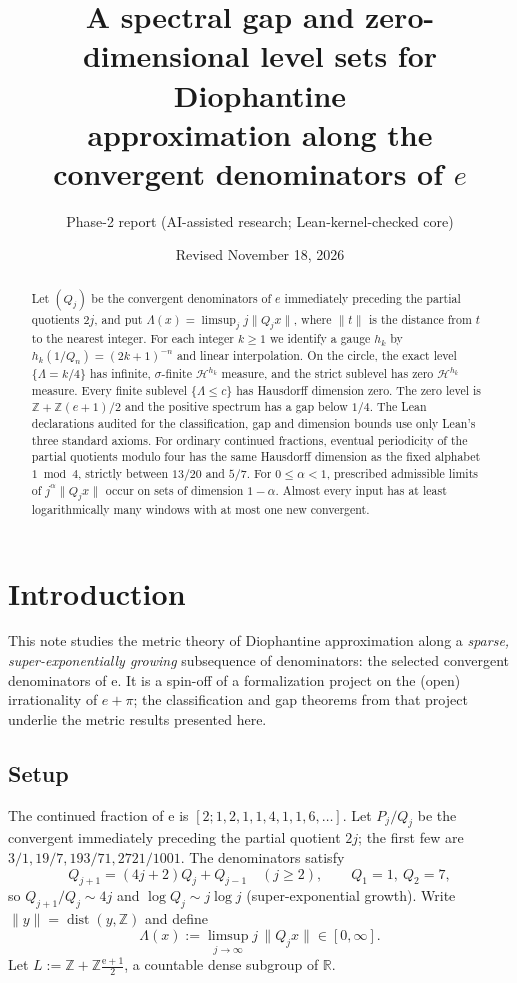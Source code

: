 \documentclass[11pt]{article}
\title{A spectral gap and zero-dimensional level sets for Diophantine\\
approximation along the convergent denominators of \texorpdfstring{$e$}{e}}
\author{Phase-2 report (AI-assisted research; Lean-kernel-checked core)}
\date{Revised November 18, 2026}
\theoremstyle{definition}
\theoremstyle{remark}
\newcommand{\R}{\mathbb{R}}
\newcommand{\Z}{\mathbb{Z}}
\newcommand{\ee}{\mathrm{e}}
\newcommand{\dist}{\operatorname{dist}}
\newcommand{\Lam}{\Lambda}
\begin{document}
\maketitle

\begin{abstract}
Let $(Q_j)$ be the convergent denominators of $e$ immediately preceding
the partial quotients $2j$, and put $\Lambda(x)=\limsup_j j\|Q_jx\|$,
where $\|t\|$ is the distance from $t$ to the nearest integer.
For each integer $k\ge1$ we identify a gauge $h_k$ by
$h_k(1/Q_n)=(2k+1)^{-n}$ and linear interpolation. On the circle,
the exact level $\{\Lambda=k/4\}$ has infinite, $\sigma$-finite
$\mathcal H^{h_k}$ measure, and the strict sublevel has zero
$\mathcal H^{h_k}$ measure. Every finite sublevel
$\{\Lambda\le c\}$ has Hausdorff dimension zero. The zero level is
$\mathbb Z+\mathbb Z(e+1)/2$ and the positive spectrum has a gap
below $1/4$. The Lean declarations audited for the classification,
gap and dimension bounds use only Lean's three standard axioms.
For ordinary continued fractions, eventual periodicity of the
partial quotients modulo four has the same Hausdorff dimension
as the fixed alphabet $1\bmod 4$, strictly between $13/20$ and $5/7$.
For $0\le\alpha<1$, prescribed admissible limits of
$j^\alpha\|Q_jx\|$ occur on sets of dimension $1-\alpha$.
Almost every input has at least logarithmically many windows with
at most one new convergent.
\end{abstract}

\section{Introduction}

This note studies the metric theory of Diophantine approximation along a
\emph{sparse, super-exponentially growing} subsequence of denominators: the
selected convergent denominators of $\ee$. It is a spin-off of a formalization
project on the (open) irrationality of $e+\pi$; the classification and gap
theorems from that project underlie the metric results presented here.

\subsection{Setup}

The continued fraction of $\ee$ is $[2;1,2,1,1,4,1,1,6,\dots]$. Let $P_j/Q_j$
be the convergent immediately preceding the partial quotient $2j$; the first
few are $3/1,19/7,193/71,2721/1001$. The denominators satisfy
\begin{equation}\label{eq:rec}
Q_{j+1}=(4j+2)Q_j+Q_{j-1}\quad(j\ge2),\qquad Q_1=1,\ Q_2=7,
\end{equation}
so $Q_{j+1}/Q_j\sim 4j$ and $\log Q_j\sim j\log j$ (super-exponential growth).
Write $\|y\|=\dist(y,\Z)$ and define
\[
\Lam(x):=\limsup_{j\to\infty} j\,\|Q_j x\|\in[0,\infty].
\]
Let $L:=\Z+\Z\frac{\ee+1}{2}$, a countable dense subgroup of $\R$.
\end{document}
